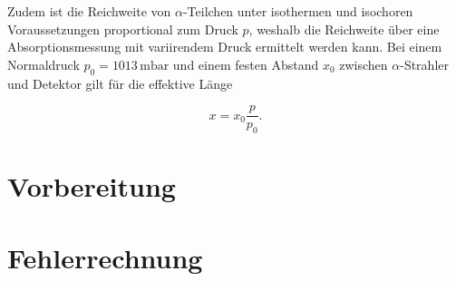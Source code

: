 \noindent Zudem ist die Reichweite von $\alpha$-Teilchen unter isothermen und isochoren Voraussetzungen proportional zum Druck $p$, 
weshalb die Reichweite über eine Absorptionsmessung mit variirendem Druck ermittelt werden kann. Bei einem Normaldruck 
$p_0 = 1013\,\unit{\milli\bar}$ und einem festen Abstand $x_0$ zwischen $\alpha$-Strahler und Detektor gilt für die effektive Länge 

\begin{equation*}
    x = x_0\frac{p}{p_0}.
\end{equation*}

\section{Vorbereitung}

\section{Fehlerrechnung}
